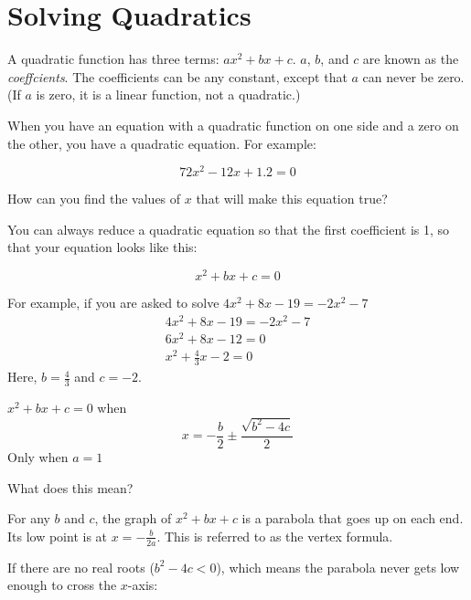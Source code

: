 \chapter{Solving Quadratics}

A quadratic function has three terms: $ax^2 + bx + c$. $a$, $b$, and
$c$ are known as the \textit{coeffcients}. The coefficients can be any
constant, except that $a$ can never be zero. (If $a$ is zero, it is a linear
function, not a quadratic.)

When you have an equation with a quadratic function on one side and a
zero on the other, you have a quadratic equation. For example:

$$72x^2 - 12x + 1.2 = 0$$

How can you find the values of $x$ that will make this equation true?

You can always reduce a quadratic equation so that the first
coefficient is 1, so that your equation looks like this:

$$x^2 +bx + c = 0$$

For example, if you are asked to solve $4x^2 + 8x - 19 = -2x^2 - 7$
\begin{multline*}
  4x^2 + 8x - 19 = -2x^2 - 7 \\
  6x^2 + 8x -12 = 0 \\
  x^2 + \frac{4}{3}x - 2 = 0
\end{multline*}
Here, $b = \frac{4}{3}$ and $c = -2$.

\begin{mdframed}[style=important]
$x^2 + bx + c = 0$ when
\begin{equation*}
x = -\frac{b}{2} \pm \frac{\sqrt{b^2 - 4c}}{2}  
\end{equation*}
Only when $a=1$
\end{mdframed}

What does this mean?

For any $b$ and $c$, the graph of $x^2 + bx + c$ is a parabola
that goes up on each end. Its low point is at $x = -\frac{b}{2a}$. This is referred to as the vertex formula.

If there are no real roots ($b^2 - 4c < 0$), which means the
parabola never gets low enough to cross the $x$-axis:
\begin{center}
\end{center}

